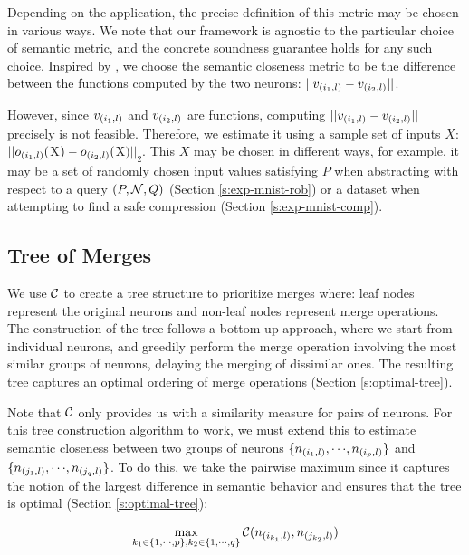 Depending on the application, the precise definition of this metric may be
chosen in various ways. We note that our framework is agnostic to the particular
choice of semantic metric, and the concrete soundness guarantee holds for any such
choice. Inspired by \cite{deep-abstract}, we choose the
semantic closeness metric to be the difference between the functions computed 
by the two neurons: $||v_{(i_1,l)} - v_{(i_2,l)}||$. 

However, since $v_{(i_1,l)}$ and $v_{(i_2,l)}$ are functions, computing
$||v_{(i_1,l)} - v_{(i_2,l)}||$ precisely is not feasible.
Therefore, we estimate it using a sample set of inputs $X$: $||o_{(i_1,l)}($X$)
- o_{(i_2,l)}($X$)||_2$. This $X$ may be chosen in different ways, for example, it
may be a set of randomly chosen input values satisfying $P$ when
abstracting with respect to a query $(P, \mathcal{N}, Q)$
(Section \ref{s:exp-mnist-rob}) or a dataset when attempting to find a
safe compression (Section \ref{s:exp-mnist-comp}).

\subsection{Tree of Merges}
\label{s:tree}

We use $\mathcal{C}$ to create a tree structure to prioritize merges where: leaf nodes
represent the original neurons and 
non-leaf nodes represent merge operations. The construction of the tree 
follows a bottom-up approach, where we start from individual neurons, 
and greedily perform the merge operation involving the most similar groups of
neurons, delaying the merging of dissimilar ones. The resulting tree
captures an optimal ordering of merge operations (Section \ref{s:optimal-tree}).

Note that $\mathcal{C}$ only provides us
with a similarity measure for pairs of neurons. For this tree construction
algorithm to work, we must extend this to estimate semantic closeness
between two groups of neurons
$\{n_{(i_1,l)}, {\cdots}, n_{(i_p,l)}\}$ and $\{n_{(j_1,l)}, {\cdots},
n_{(j_q,l)}\}$. To do this, we take the pairwise maximum since it captures the
notion of the largest difference in semantic behavior and ensures that the tree
is optimal (Section \ref{s:optimal-tree}): 

\begin{equation*}
\begin{aligned}
    \max_{k_1 \in \{1, {\cdots}, p\},
    k_2 \in \{1, {\cdots}, q\}} \mathcal{C}( n_{(i_{k_1},l)}, n_{(j_{k_2},l)} )
\end{aligned}
\end{equation*}

